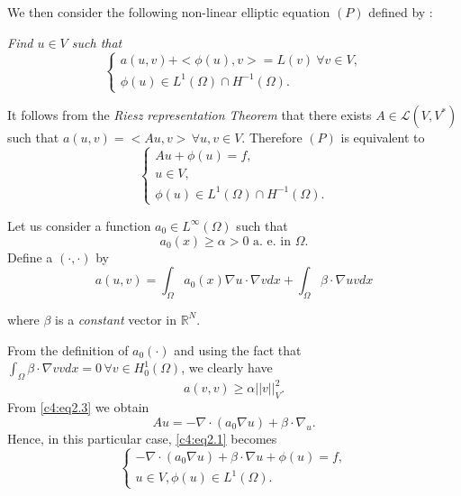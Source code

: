 We then consider the following non-linear elliptic equation $(P)$ defined by :

\textit{Find $u \in V$ such that}
\begin{equation}
\begin{cases}
a (u, v) + < \phi (u), v > = L (v) \ \forall v \in V,\\
\phi (u) \in L^1 (\Omega) \cap H^{-1} (\Omega). 
\tag{P}\label{c4:eqp} 
\end{cases}
\end{equation}

It follows from the \textit{Riesz representation Theorem} that there exists $A \in \mathscr{L} (V, V^*)$ such that $a (u, v) = <Au, v>\, \forall u, v \in V$. Therefore $(P)$ is equivalent to 
\begin{equation}
\begin{cases}
Au + \phi (u) = f, \\
u \in V,\\
\phi (u) \in L^1 (\Omega) \cap H^{-1} (\Omega). \tag{2.1}\label{c4:eq2.1}
\end{cases}
\end{equation}\pageoriginale 

\setcounter{example}{0}
\begin{example}\label{c4:exa2.1} %
Let us consider a function $a_0 \in L^\infty (\Omega)$ such that 
\begin{equation}
a_0 (x) \geq \alpha > 0 \text{ a. e. in } \Omega. \tag{2.2}\label{c4:eq2.2}
\end{equation}
Define a $(\cdot , \cdot)$ by
\begin{equation}
a (u, v) = \int_\Omega a_0 (x) \nabla u \cdot \nabla v dx +\int_\Omega
\beta \cdot \nabla u vdx \tag{2.3}\label{c4:eq2.3} 
\end{equation}

where $\beta$ is a {\em constant} vector in $\mathbb{R}^N$.
\end{example}

From the definition of $a_0 (\cdot)$ and using the fact that $\int_\Omega \beta \cdot \nabla v vdx = 0\, \forall v \in H^1_0 (\Omega)$, we clearly have
\begin{equation}
a (v, v) \geq \alpha || v ||_V^2. \tag{2.4}\label{c4:eq2.4}
\end{equation}
From \eqref{c4:eq2.3} we obtain
\begin{equation}
Au = - \nabla \cdot (a_0 \nabla u) + \beta \cdot \nabla_u. \tag{2.5}\label{c4:eq2.5}
\end{equation}
Hence, in this particular case, \eqref{c4:eq2.1} becomes
\begin{equation}
\begin{cases}
- \nabla \cdot (a_0 \nabla u) + \beta \cdot \nabla u + \phi (u) = f, \\
u \in V, \phi (u) \in L^1 (\Omega). \tag{2.6}\label{c4:eq2.6}
\end{cases}
\end{equation}

